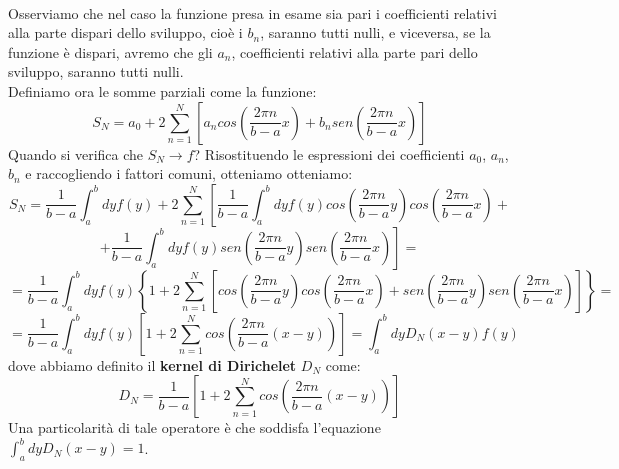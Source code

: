 \\Osserviamo che nel caso la funzione presa in esame sia pari i coefficienti relativi alla parte dispari dello sviluppo, cioè i $b_n$, saranno tutti nulli, e viceversa, se la funzione è dispari, avremo che gli $a_n$, coefficienti relativi alla parte pari dello sviluppo, saranno tutti nulli.\\
Definiamo ora le somme parziali come la funzione:
$$S_N=a_0 + 2 \sum_{n=1} ^{N} \left[ a_n cos \left( \frac{2 \pi n}{b-a}x \right) + b_n sen \left( \frac{2 \pi n}{b-a}x \right) \right]$$
Quando si verifica che $S_N \to f$? Risostituendo le espressioni dei coefficienti $a_0$, $a_n$, $b_n$ e raccogliendo i fattori comuni, otteniamo otteniamo:
$$S_N=\frac{1}{b-a} \int_a ^b dy f(y) + 2 \sum_{n=1} ^{N} \left[ \frac{1}{b-a} \int_a ^b dy f(y) cos \left( \frac{2 \pi n}{b-a}y \right) cos \left( \frac{2 \pi n}{b-a}x \right) + \right.$$
$$\left. + \frac{1}{b-a} \int_a ^b dy f(y) sen \left( \frac{2 \pi n}{b-a}y \right) sen \left( \frac{2 \pi n}{b-a}x \right) \right]=$$
$$=\frac{1}{b-a} \int_a ^b dy f(y) \left\{ 1 + 2 \sum_{n=1} ^{N} \left[ cos \left( \frac{2 \pi n}{b-a}y \right) cos \left( \frac{2 \pi n}{b-a}x \right) + sen \left( \frac{2 \pi n}{b-a}y \right) sen \left( \frac{2 \pi n}{b-a}x \right) \right] \right\}=$$
$$=\frac{1}{b-a} \int_a ^b dy f(y) \left[ 1 + 2 \sum_{n=1} ^{N}  cos \left( \frac{2 \pi n}{b-a}(x-y) \right)\right] = \int_a ^b dy D_N(x-y) f(y)$$
dove abbiamo definito il \textbf{kernel di Dirichelet} $D_N$ come:
$$D_N=\frac{1}{b-a} \left[ 1 + 2 \sum_{n=1} ^{N}  cos \left( \frac{2 \pi n}{b-a}(x-y) \right)\right]$$
Una particolarità di tale operatore è che soddisfa l'equazione $ \int_a ^b dy D_N(x-y)=1$.
